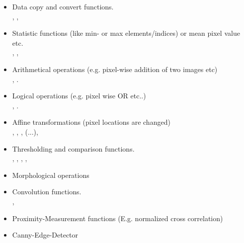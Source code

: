 \begin{itemize}

\item Data copy and convert functions.\\
, , 

\item Statistic functions (like min- or max elements/indices) or mean pixel value etc.\\
, , 

\item Arithmetical operations (e.g. pixel-wise addition of two images etc)\\
, .

\item Logical operations (e.g. pixel wise OR etc..)\\ 
, .

\item Affine transformations (pixel locations are changed)\\
, , , (...),   

\item Thresholding and comparison functions.\\
, , , , 

\item Morphological operations\\

\item Convolution functions.\\
, 

\item Proximity-Measurement functions (E.g. normalized cross correlation)\\

\item Canny-Edge-Detector\\


\end{itemize}
